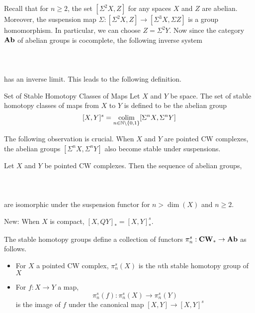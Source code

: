 \documentclass[a4paper]{article}
\begin{document}
Recall that for $n\geq 2$, the set $[\Sigma^2X,Z]$ for any spaces $X$ and $Z$ are abelian. Moreover, the suspension map $\Sigma:[\Sigma^2X,Z]\to[\Sigma^3X,\Sigma Z]$ is a group homomorphism. In particular, we can choose $Z=\Sigma^2Y$. Now since the category $\bold{Ab}$ of abelian groups is cocomplete, the following inverse system \\~\\
\\~\\
has an inverse limit. This leads to the following definition. 

\begin{defn}{Set of Stable Homotopy Classes of Maps}{} Let $X$ and $Y$ be space. The set of stable homotopy classes of maps from $X$ to $Y$ is defined to be the abelian group $$[X,Y]^s=\operatorname*{colim}_{n\in\mathbb{N}\setminus\{0,1\}}[\Sigma^nX,\Sigma^nY]$$
\end{defn}

The following observation is crucial. When $X$ and $Y$ are pointed CW complexes, the abelian groups $[\Sigma^n X,\Sigma^n Y]$ also become stable under suspensions. 

\begin{thm}{}{} Let $X$ and $Y$ be pointed CW complexes. Then the sequence of abelian groups, \\~\\
\\~\\
are isomorphic under the suspension functor for $n>\dim(X)$ and $n\geq 2$. 
\end{thm}

New: When $X$ is compact, $[X,QY]_\ast=[X,Y]_\ast^s$. 

\begin{thm}{}{} The stable homotopy groups define a collection of functors $\pi_n^s:\bold{CW}_\ast\to\bold{Ab}$ as follows. 
\begin{itemize}
\item For $X$ a pointed CW complex, $\pi_n^s(X)$ is the $n$th stable homotopy group of $X$
\item For $f:X\to Y$ a map, $$\pi_n^s(f):\pi_n^s(X)\to\pi_n^s(Y)$$ is the image of $f$ under the canonical map $[X,Y]\to[X,Y]^s$
\end{itemize}
\end{thm}
\end{document}
